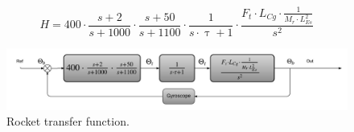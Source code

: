 \begin{equation}    
H = 400 \cdot \frac{s + 2}{s + 1000} \cdot \frac{s + 50}{s + 1100} \cdot \frac{1}{s \cdot \uptau + 1} \cdot \frac{F_t \cdot L_{Cg} \cdot \frac{1}{M_r \cdot L_{Es}^2}}{s^2}  
\end{equation}
\label{eq:RocketTfEqu}

\begin{figure}[htbp]
	\centering
	
	\includegraphics[width=\textwidth]{figures/Rocket/design/final_chart_number}
	\caption{Rocket transfer function.}
	\label{fig:FinalChartNumbers}
	
\end{figure}